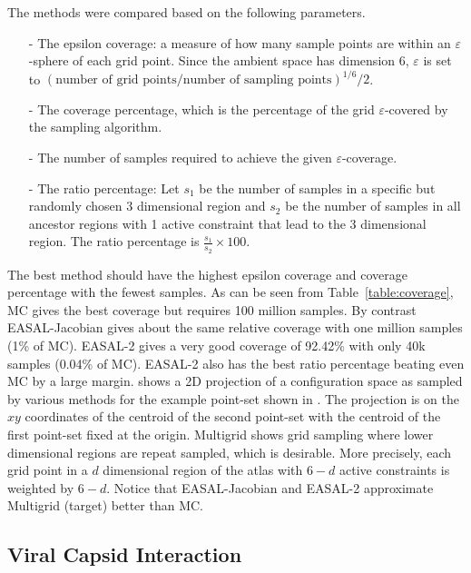 The methods were compared based on the following parameters.
\begin{itemize}
\item [-] The epsilon coverage: a measure of how many sample points are within
an $ \varepsilon$-sphere of each grid point. Since the ambient space has
dimension 6, $\varepsilon$ is set to
$(\text{number of grid points} / \text{number of sampling points})^{1/6} /2$.

\item [-] The coverage percentage, which is the percentage of the grid
$\varepsilon$-covered by the sampling algorithm. 

\item [-] The number of samples required to achieve the given
$\varepsilon$-coverage.

\item [-] The ratio percentage: Let $s_1$ be the number of samples in a specific but randomly chosen
3 dimensional region and $s_2$ be the number of samples in all 
ancestor regions with 1 active constraint that lead to the 3 dimensional region.  The
ratio percentage is $\frac{s_1}{s_2}\times 100$.

\end{itemize}

The best method should have the highest epsilon coverage and coverage
percentage with the fewest samples. As can be seen from
Table~\ref{table:coverage}, MC gives the best coverage but requires 100
million samples. By contrast EASAL-Jacobian gives about the same relative
coverage with one million samples (1\% of MC). EASAL-2 gives a very good
coverage of 92.42\% with only 40k samples (0.04\% of MC). EASAL-2 also has the
best ratio percentage beating even MC by a large margin.
 shows a 2D projection of a configuration space as
sampled by various methods for the example point-set shown in
. The projection is on the $xy$ coordinates of the
centroid of the second point-set with the centroid of the first point-set fixed
at the origin. Multigrid shows grid sampling where lower dimensional regions
are repeat sampled, which is desirable. More precisely, each grid point in a
$d$ dimensional region of the atlas with $6-d$ active constraints is weighted
by $6-d$. Notice that EASAL-Jacobian and EASAL-2 approximate Multigrid (target)
better than MC.




\subsection{Viral Capsid Interaction}

